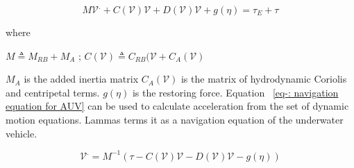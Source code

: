 \documentclass[12pt]{dalcsthesis}
\begin{document}
\begin{equation}
\label{eq:vehicle hydrodynamics}
M\mathcal{{V}}^{.}+C(\mathcal{V})\mathcal{V}+D(\mathcal{V})\mathcal{V}+g(\eta)=\tau_{E}+\tau%
\end{equation}

where 

$M \triangleq M_{RB} + M_{A}$ ; $C(\mathcal{V}) \triangleq C_{RB}(\mathcal{V} + C_{A}(\mathcal{V})$

$M_A$ is the added inertia  matrix $C_{A}(\mathcal{V})$ is the matrix of hydrodynamic Coriolis and centripetal terms. $g(\eta)$ is the restoring force.
Equation ~\ref{eq-: navigation equation for AUV} can be used to calculate acceleration from the set of dynamic motion equations. Lammas \cite{Lammas2004} terms it as a navigation equation of the underwater vehicle.   


\begin{equation}
\label{eq-: navigation equation for AUV}
\mathcal{V}^{.} = M^{-1}(\tau-C(\mathcal{V})\mathcal{V}-D(\mathcal{V})\mathcal{V}-g(\eta))
\end{equation}
\end{document}
